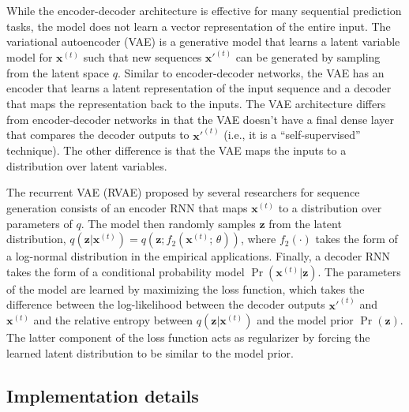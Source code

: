 \documentclass[hidelinks,12pt]{article}
\begin{document}
While the encoder-decoder architecture is effective for many sequential prediction tasks, the model does not learn a vector representation of the entire input. The variational autoencoder (VAE) \citep{kingma2013auto} is a generative model that learns a latent variable model for $\boldsymbol{x}^{(t)}$ such that new sequences $\boldsymbol{x'}^{(t)}$ can be generated by sampling from the latent space $q$. Similar to encoder-decoder networks, the VAE has an encoder that learns a latent representation of the input sequence and a decoder that maps the representation back to the inputs. The VAE architecture differs from encoder-decoder networks in that the VAE doesn't have a final dense layer that compares the decoder outputs to  $\boldsymbol{x'}^{(t)}$ (i.e., it is a ``self-supervised'' technique). The other difference is that the VAE maps the inputs to a distribution over latent variables.

The recurrent VAE (RVAE) proposed by several researchers \citep{fabius2014variational, chung2015recurrent,bowman2015generating} for sequence generation consists of an encoder RNN that maps $\boldsymbol{x}^{(t)}$ to a distribution over parameters of $q$. The model then randomly samples $\boldsymbol{z}$ from the latent distribution, $q(\boldsymbol{z} | \boldsymbol{x}^{(t)}) = q (\boldsymbol{z}; f_2(\boldsymbol{x}^{(t)};\, \theta))$, where $f_2(\cdot)$ takes the form of a log-normal distribution in the empirical applications. Finally, a decoder RNN takes the form of a conditional probability model $\Pr (\boldsymbol{x}^{(t)} | \boldsymbol{z})$. The parameters of the model are learned by maximizing the loss function, which takes the difference between the log-likelihood between the decoder outputs $\boldsymbol{x'}^{(t)}$ and $\boldsymbol{x}^{(t)}$ and the relative entropy between  $q(\boldsymbol{z} | \boldsymbol{x}^{(t)})$ and the model prior $\Pr (\boldsymbol{z})$. The latter component of the loss function acts as regularizer by forcing the learned latent distribution to be similar to the model prior. 

\subsection{Implementation details} 
\end{document}
